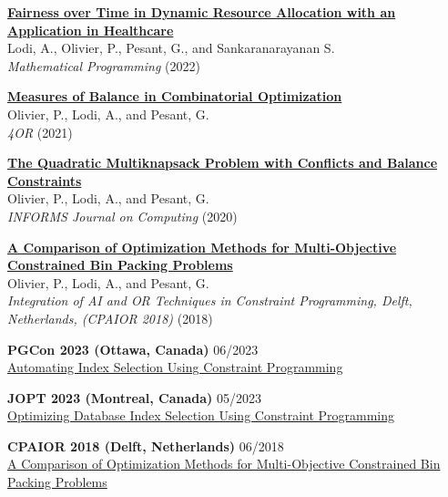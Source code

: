 \documentclass{memoir}
\begin{document}
\begin{list}{}
  

  \Item \href{https://doi.org/10.1007/s10107-022-01904-6}{\textbf{Fairness over Time in Dynamic Resource Allocation with an Application in Healthcare}} \\
  Lodi, A., Olivier, P., Pesant, G., and Sankaranarayanan S. \\
  \emph{Mathematical Programming} (2022)

  \Item \href{https://doi.org/10.1007/s10288-021-00486-x}{\textbf{Measures of Balance in Combinatorial Optimization}} \\
  Olivier, P., Lodi, A., and Pesant, G. \\
  \emph{4OR} (2021)

  \Item \href{https://doi.org/10.1287/ijoc.2020.0983}{\textbf{The Quadratic Multiknapsack Problem with Conflicts and Balance Constraints}} \\
  Olivier, P., Lodi, A., and Pesant, G. \\
  \emph{INFORMS Journal on Computing} (2020)

  \Item \href{https://doi.org/10.1007/978-3-319-93031-2_33}{\textbf{A Comparison of Optimization Methods for Multi-Objective Constrained Bin Packing Problems}} \\
  Olivier, P., Lodi, A., and Pesant, G. \\
  \emph{Integration of AI and OR Techniques in Constraint Programming, Delft, Netherlands, (CPAIOR 2018)} (2018)


  \Item \textbf{PGCon 2023 (Ottawa, Canada)} \hfill 06/2023 \\
  \href{https://www.pgcon.org/events/pgcon_2023/schedule/session/422-automating-index-selection-using-constraint-programming/}{Automating Index Selection Using Constraint Programming}

  \Item \textbf{JOPT 2023 (Montreal, Canada)} \hfill 05/2023 \\
  \href{https://symposia.cirrelt.ca/CORS-JOPT/fr/schedule?slot_id=2207}{Optimizing Database Index Selection Using Constraint Programming}
  
  \Item \textbf{CPAIOR 2018 (Delft, Netherlands)} \hfill 06/2018 \\
  \href{http://icaps18.icaps-conference.org/schedule}{A Comparison of Optimization Methods for Multi-Objective Constrained Bin Packing Problems}


\end{list}
\end{document}

